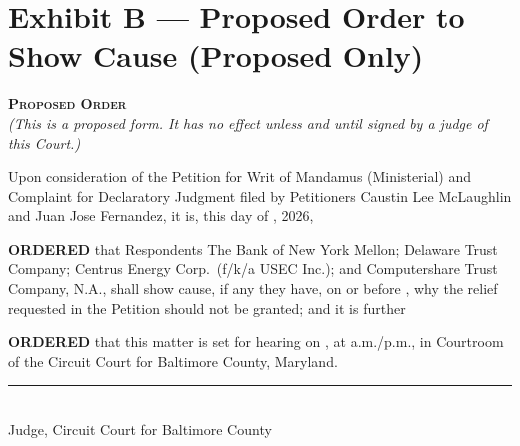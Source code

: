 \documentclass[12pt,letterpaper]{article}
\begin{document}
\section*{Exhibit B --- Proposed Order to Show Cause (Proposed Only)}

\begin{center}
\textbf{\textsc{Proposed Order}}\\[4pt]
\textit{(This is a proposed form. It has no effect unless and until signed by a
judge of this Court.)}
\end{center}

\vspace{0.2in}
Upon consideration of the Petition for Writ of Mandamus (Ministerial) and
Complaint for Declaratory Judgment filed by Petitioners Caustin Lee McLaughlin
and Juan Jose Fernandez, it is, this \underline{\hspace{0.4in}} day of
\underline{\hspace{1.2in}}, 2026,

\vspace{0.15in}
\textbf{ORDERED} that Respondents The Bank of New York Mellon; Delaware Trust
Company; Centrus Energy Corp.\ (f/k/a USEC Inc.); and Computershare Trust
Company, N.A., shall show cause, if any they have, on or before
\underline{\hspace{1.2in}}, why the relief requested in the Petition should not
be granted; and it is further

\textbf{ORDERED} that this matter is set for hearing on
\underline{\hspace{1.2in}}, at \underline{\hspace{0.8in}} a.m./p.m., in
Courtroom \underline{\hspace{0.6in}} of the Circuit Court for Baltimore County,
Maryland.

\vspace{0.4in}
\noindent\rule{3.2in}{0.4pt}\\
Judge, Circuit Court for Baltimore County
\end{document}
